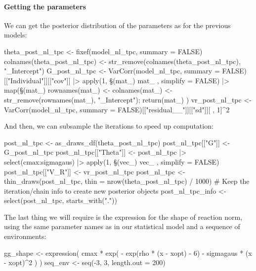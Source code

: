\documentclass[a4paper,12pt,twoside]{article}
\begin{document}
\paragraph{Getting the parameters}
We can get the posterior distribution of the parameters as for the previous models:
\begin{Rinput}
theta_post_nl_tpc <- fixef(model_nl_tpc, summary = FALSE)
colnames(theta_post_nl_tpc) <- str_remove(colnames(theta_post_nl_tpc), "_Intercept")
G_post_nl_tpc <-
    VarCorr(model_nl_tpc, summary = FALSE)[["Individual"]][["cov"]] |>
    apply(1, \§§(mat_) { mat_ }, simplify = FALSE) |>
    map(\§§(mat_) { 
      rownames(mat_) <- colnames(mat_) <- str_remove(rownames(mat_), "_Intercept"); return(mat_) 
    })
vr_post_nl_tpc <-
    VarCorr(model_nl_tpc, summary = FALSE)[["residual__"]][["sd"]][ , 1]^2
\end{Rinput}
And then, we can subsample the iterations to speed up computation:
\begin{Rinput}
post_nl_tpc <- as_draws_df(theta_post_nl_tpc)
post_nl_tpc[["G"]] <- G_post_nl_tpc
post_nl_tpc[["Theta"]] <-
    post_nl_tpc |>
    select(cmax:sigmagaus) |>
    apply(1, \§§(vec_) { vec_ }, simplify = FALSE)
post_nl_tpc[["V_R"]] <- vr_post_nl_tpc
post_nl_tpc <- thin_draws(post_nl_tpc, thin = nrow(theta_post_nl_tpc) / 1000)
# Keep the iteration/chain info to create new posterior objects
post_nl_tpc_info <- select(post_nl_tpc, starts_with("."))
\end{Rinput}
The last thing we will require is the expression for the shape of reaction norm, using the same parameter names as in our statistical model and a sequence of environments:
\begin{Rinput}
gg_shape <- expression(
    cmax * exp(
        - exp(rho * (x - xopt) - 6) -
            sigmagaus * (x - xopt)^2
    )
)
seq_env <- seq(-3, 3, length.out = 200)
\end{Rinput}
\end{document}
